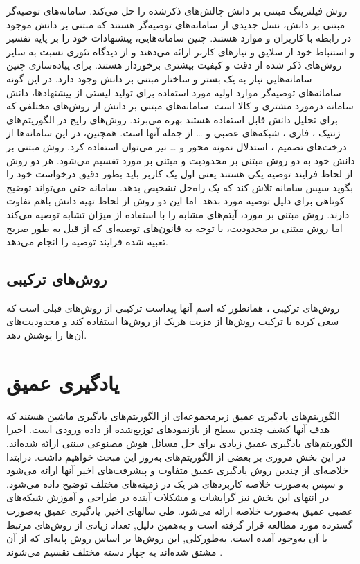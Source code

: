 روش فیلترینگ مبتنی بر دانش
چالش‌های ذکرشده را حل می‌کند. سامانه‌های توصیه‌گر مبتنی بر دانش، نسل جدیدی از سامانه‌های توصیه‌گر هستند که مبتنی بر دانش موجود در رابطه با کاربران و موارد هستند. چنین سامانه‌هایی، پیشنهادات خود را بر پایه تفسیر و استنباط خود از سلایق و نیاز‌های کاربر ارائه می‌دهند و از دیدگاه تئوری نسبت به سایر روش‌های ذکر شده از دقت و کیفیت بیشتری برخوردار هستند. برای پیاده‌سازی چنین سامانه‌هایی نیاز به یک بستر و ساختار مبتنی بر دانش وجود دارد. در این گونه سامانه‌های توصیه‌گر موارد اولیه مورد استفاده برای تولید لیستی از پیشنهادها، دانش سامانه درمورد مشتری و کالا است. سامانه‌های مبتنی بر دانش از روش‌های مختلفی که برای تحلیل دانش قابل استفاده هستند بهره می‌برند. روش‌های رایج در الگوریتم‌های ژنتیک
،
فازی
،
شبکه‌های عصبی
و … از جمله آنها است. همچنین، در این سامانه‌ها از درخت‌های تصمیم
،
استدلال نمونه ‌محور
و … نیز می‌توان استفاده کرد. روش مبتنی بر دانش خود به دو روش مبتنی بر محدودیت 
و مبتنی بر مورد 
تقسیم می‌شود. هر دو روش از لحاظ فرایند توصیه یکی هستند یعنی اول یک کاربر باید بطور دقیق درخواست خود را بگوید سپس سامانه تلاش ‌کند که یک راه‌حل تشخیص بدهد. سامانه حتی می‌تواند توضیح کوتاهی برای دلیل توصیه مورد بدهد. اما این دو روش از لحاظ تهیه دانش باهم تفاوت دارند. روش مبتنی بر مورد، آیتم‌های مشابه را با استفاده از میزان تشابه 
توصیه می‌کند اما روش مبتنی بر محدودیت، با توجه به قانون‌های توصیه‌ای که از قبل به طور صریح تعبیه شده فرایند توصیه را انجام می‌دهد.

\subsection{روش‌های ترکیبی}
روش‌های ترکیبی
،
همانطور که اسم آنها پیداست ترکیبی از روش‌های قبلی است که سعی کرده با ترکیب روش‌ها از مزیت هریک از روش‌ها استفاده کند و محدودیت‌های آن‌ها را پوشش دهد.

\section{یادگیری عمیق}

الگوریتم‌های یادگیری عمیق
زیرمجموعه‌ای از الگوریتم‌های یادگیری ماشین هستند که هدف آنها کشف چندین سطح از بازنمودهای توزیع‌شده
از داده ورودی است. اخیرا الگوریتم‌های یادگیری عمیق زیادی برای حل مسائل هوش مصنوعی سنتی ارائه شده‌اند. در این بخش مروری بر بعضی از الگوریتم‌های به‌روز این مبحث خواهیم داشت. درابتدا خلاصه‌ای از چندین روش یادگیری عمیق متفاوت و پیشرفت‌های اخیر آنها ارائه می‌شود و سپس به‌صورت خلاصه کاربردهای هر یک در زمینه‌های مختلف توضیح داده ‌می‌شود. در انتهای این بخش نیز گرایشات و مشکلات آینده در طراحی و آموزش شبکه‌های عصبی عمیق به‌صورت خلاصه ارائه می‌شود. طی سالهای اخیر, یادگیری عمیق به‌صورت گسترده مورد مطالعه قرار گرفته ‌است و به‌همین دلیل, تعداد زیادی از روش‌های مرتبط با آن به‌وجود آمده ‌است. به‌طورکلی, این روش‌ها بر اساس روش پایه‌ای که از آن مشتق شده‌اند به چهار دسته مختلف تقسیم می‌شوند
\cite{Guo Y2016}.

